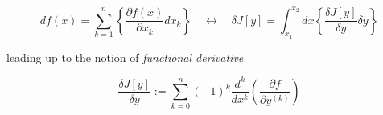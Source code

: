\begin{equation*}
  df(x) = \sum_{k=1}^{n}
  \left\{ \frac{\partial f(x)}{\partial x_k} dx_k \right\}
  \quad \longleftrightarrow \quad
  \delta J[y] = \int_{x_1}^{x_2} dx
  \left\{ \frac{\delta J[y]}{\delta y} \delta y \right\}
\end{equation*}

leading up to the notion of \emph{functional derivative}

\begin{equation} \label{eq:functional_derivative}
  \frac{\delta J[y]}{\delta y} := \sum_{k = 0}^{n} (-1)^k \frac{d^k}{dx^k}
  \left( \frac{\partial f}{\partial y^{(k)}}\right)
\end{equation}
